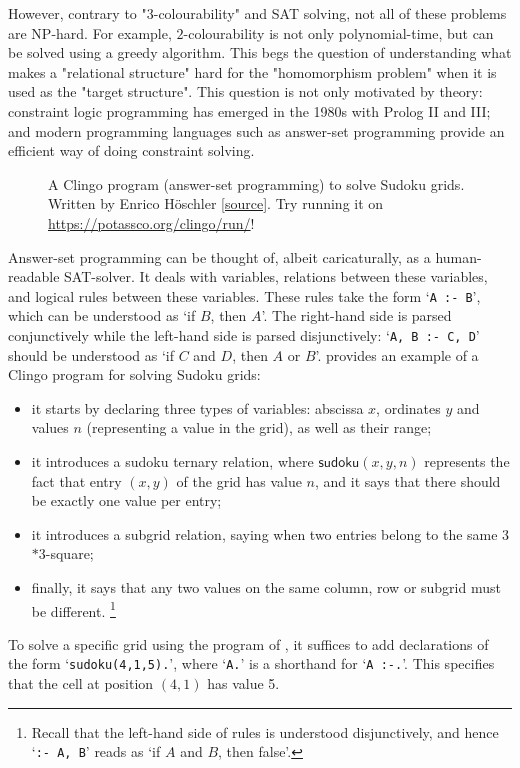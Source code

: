 However, contrary to "$3$-colourability" and SAT solving, not all of these problems are NP-hard. For example, $2$-colourability is not only polynomial-time,
but can be solved using a greedy algorithm. This begs the question of understanding what
makes a "relational structure" hard for the "homomorphism problem" when it is used
as the "target structure".
This question is not only motivated by theory: constraint logic programming has emerged in the 1980s
with Prolog II and III; and modern programming languages such as answer-set programming provide an 
efficient way of doing constraint solving.

\begin{figure}
	\centering
	
	\caption{
		\AP\label{fig:ex-sudoku-asp}
		A Clingo program (answer-set programming) to solve Sudoku grids.
		Written by Enrico Höschler
		\href{https://ddmler.github.io/asp/2018/07/10/answer-set-programming-sudoku-solver.html}{[source]}.
		Try running it on \url{https://potassco.org/clingo/run/}!
	}
\end{figure}

Answer-set programming can be thought of, albeit caricaturally, as a human-readable
SAT-solver. It deals with variables, relations between these variables,
and logical rules between these variables. These rules take the form
`\lstinline[language=myclingo]|A :- B|', which can be understood as `if $B$, then $A$'.
The right-hand side is parsed conjunctively while the left-hand side is parsed disjunctively:
`\lstinline[language=myclingo]|A, B :- C, D|' should be understood as `if $C$ and $D$, then $A$ or $B$'.
 provides
an example of a Clingo program for solving Sudoku grids:
\begin{itemize}
	\item it starts by declaring three types of variables: abscissa $x$, ordinates $y$ and values $n$ (representing a value in the grid), as well as their range;
	\item it introduces a \textsf{sudoku} ternary relation, where $\textsf{sudoku}(x,y,n)$
		represents the fact that entry $(x,y)$ of the grid has value $n$,
		and it says that there should be exactly one value per entry;
	\item it introduces a \textsf{subgrid} relation, saying when two entries
		belong to the same 3$\ast$3-square;
	\item finally, it says that any two values on the same column, row or subgrid
		must be different.%
		\footnote{Recall that the left-hand side of rules is understood disjunctively,
		and hence `\lstinline[language=myclingo]|:- A, B|' reads as `if $A$ and $B$, then false'.}
\end{itemize}
To solve a specific grid using the program of ,
it suffices to add declarations of the form `\lstinline[language=myclingo]|sudoku(4,1,5).|',
where `\lstinline[language=myclingo]|A.|' is a shorthand for `\lstinline[language=myclingo]|A :-.|'.
This specifies that the cell at position $(4,1)$ has value 5.

